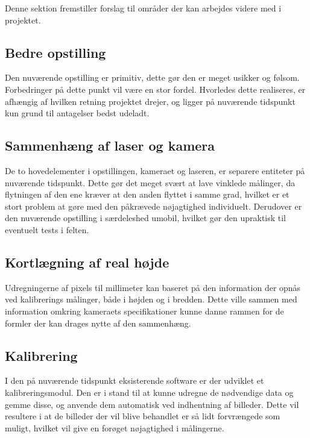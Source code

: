 Denne sektion fremstiller forslag til områder der kan arbejdes videre med i projektet.

\subsection{Bedre opstilling}

Den nuværende opstilling er primitiv, dette gør den er meget usikker og følsom. Forbedringer på dette punkt vil være en stor fordel. Hvorledes dette realiseres, er afhængig af hvilken retning projektet drejer, og ligger på nuværende tidspunkt kun grund til antagelser bedst udeladt.

\subsection{Sammenhæng af laser og kamera}

De to hovedelementer i opstillingen, kameraet og laseren, er separere entiteter på nuværende tidspunkt. Dette gør det meget svært at lave vinklede målinger, da flytningen af den ene kræver at den anden flyttet i samme grad, hvilket er et stort problem at gøre med den påkrævede nøjagtighed individuelt. Derudover er den nuværende opstilling i særdeleshed umobil, hvilket gør den upraktisk til eventuelt tests i felten.

\subsection{Kortlægning af real højde}

Udregningerne af pixels til millimeter kan baseret på den information der opnås ved kalibrerings målinger, både i højden og i bredden. Dette ville sammen med information omkring kameraets specifikationer kunne danne rammen for de formler der kan drages nytte af den sammenhæng.

\subsection{Kalibrering}

I den på nuværende tidspunkt eksisterende software er der udviklet et kalibreringsmodul.
Den er i stand til at kunne udregne de nødvendige data og gemme disse, og anvende dem automatisk ved indhentning af billeder.
Dette vil resultere i at de billeder der vil blive behandlet er så lidt forvrængede som muligt, hvilket vil give en forøget nøjagtighed i målingerne.
